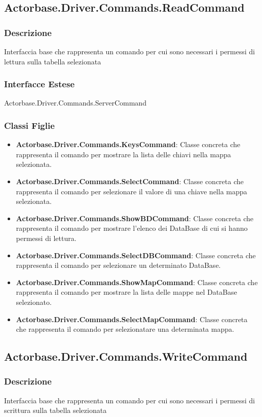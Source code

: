 \documentclass[a4paper]{article}
\begin{document}
		\subsection{Actorbase.Driver.Commands.ReadCommand}
				\subsubsection{Descrizione} Interfaccia base che rappresenta un comando per cui sono necessari i permessi di lettura sulla tabella selezionata
				\subsubsection{Interfacce Estese} Actorbase.Driver.Commands.ServerCommand
				\subsubsection{Classi Figlie}
					\begin{itemize}
						\item \textbf{Actorbase.Driver.Commands.KeysCommand}:
							Classe concreta che rappresenta il comando per mostrare la lista delle chiavi nella mappa selezionata.
						\item \textbf{Actorbase.Driver.Commands.SelectCommand}:
							Classe concreta che rappresenta il comando per selezionare il valore di una chiave nella mappa selezionata.
						\item \textbf{Actorbase.Driver.Commands.ShowBDCommand}:
							Classe concreta che rappresenta il comando per mostrare l'elenco dei DataBase di cui si hanno permessi di lettura.
						\item \textbf{Actorbase.Driver.Commands.SelectDBCommand}:
							Classe concreta che rappresenta il comando per selezionare un determinato DataBase.
						\item \textbf{Actorbase.Driver.Commands.ShowMapCommand}:
							Classe concreta che rappresenta il comando per mostrare la lista delle mappe nel DataBase selezionato.
						\item \textbf{Actorbase.Driver.Commands.SelectMapCommand}:
							Classe concreta che rappresenta il comando per selezionatare una determinata mappa.
					\end{itemize}


		\subsection{Actorbase.Driver.Commands.WriteCommand}
			\subsubsection{Descrizione} Interfaccia base che rappresenta un comando per cui sono necessari i permessi di scrittura sulla tabella selezionata
\end{document}
